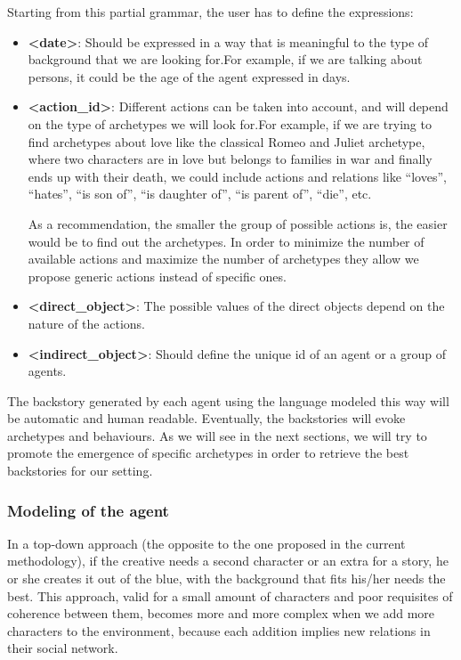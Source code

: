 \documentclass{sig-alternate}
\begin{document}
Starting from this partial grammar, the user has to define the expressions:
\begin{itemize}
\item \textbf{<date>}: Should be expressed in a way that is meaningful to the type of background that we are looking for.For example, if we are talking about persons, it could be the age of the agent expressed in days.

\item \textbf{<action\_id>}: Different actions can be taken into account, and will depend on the type of archetypes we will look for.For example, if we are trying to find archetypes about love like the classical Romeo and Juliet archetype, where two characters are in love but belongs to families in war and finally ends up with their death, we could include actions and relations like ``loves'', ``hates'', ``is son of'', ``is daughter of'', ``is parent of'', ``die'', etc.

As a recommendation, the smaller the group of possible actions is, the easier would be to find out the archetypes. In order to minimize the number of available actions and maximize the number of archetypes they allow we propose generic actions instead of specific ones.

\item \textbf{<direct\_object>}: The possible values of the direct objects depend on the nature of the actions.

\item \textbf{<indirect\_object>}: Should define the unique id of an agent or a group of agents.

\end{itemize}

The backstory generated by each agent using the language modeled this way will be automatic and human readable. Eventually, the backstories will evoke archetypes and behaviours. As we will see in the next sections, we will try to promote the emergence of specific archetypes in order to retrieve the best backstories for our setting.



\subsubsection{Modeling of the agent}


In a top-down approach (the opposite to the one proposed in the current methodology), if the creative needs a second character or an extra for a story, he or she creates it out of the blue, with the background that fits his/her needs the best. This approach, valid for a small amount of characters and poor requisites of coherence between them, becomes more and more complex when we add more characters to the environment, because each addition implies new relations in their social network.
\end{document}
